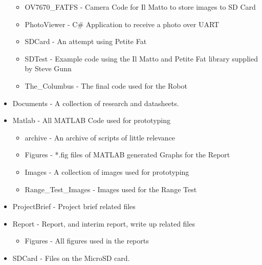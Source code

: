 \begin{itemize}
\begin{itemize}
\item OV7670\_FATFS - Camera Code for Il Matto to store images to SD Card
\item PhotoViewer - C\# Application to receive a photo over UART
\item SDCard - An attempt using Petite Fat
\item SDTest - Example code using the Il Matto and Petite Fat library supplied by Steve Gunn
\item The\_Columbus - The final code used for the Robot
\end{itemize}
\item Documents - A collection of research and datasheets. 
\item Matlab - All MATLAB Code used for prototyping
\begin{itemize}
\item archive - An archive of scripts of little relevance
\item Figures - *.fig files of MATLAB generated Graphs for the Report
\item Images - A collection of images used for prototyping
\item Range\_Test\_Images - Images used for the Range Test
\end{itemize}
\item ProjectBrief - Project brief related files
\item Report - Report, and interim report, write up related files
\begin{itemize}
\item Figures - All figures used in the reports
\end{itemize}
\item SDCard - Files on the MicroSD card. 
\end{itemize} 
        
